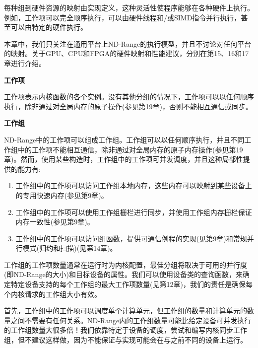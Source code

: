 每种组到硬件资源的映射由实现定义，这种灵活性使程序能够在各种硬件上执行。例如，工作项可以完全顺序执行，可以由硬件线程和/或SIMD指令并行执行，甚至可以由特定的硬件执行。\par

本章中，我们只关注在通用平台上ND-Range的执行模型，并且不讨论对任何平台的映射。关于GPU、CPU和FPGA的硬件映射和性能建议，分别在第15、16和17章进行介绍。\par

\hspace*{\fill} \par %
\textbf{工作项}

工作项表示内核函数的各个实例。没有其他分组的情况下，工作项可以以任何顺序执行，除非通过对全局内存的原子操作(参见第19章)，否则不能相互通信或同步。\par

\hspace*{\fill} \par %
\textbf{工作组}

ND-Range中的工作项可以组成工作组。工作组可以以任何顺序执行，并且不同工作组中的工作项不能相互通信，除非通过对全局内存的原子内存操作(参见第19章)。然而，使用某些构造时，工作组中的工作项可并发调度，并且这种局部性提供的能力有:\par

\begin{enumerate}
	\item 工作组中的工作项可以访问工作组本地内存，这些内存可以映射到某些设备上的专用快速内存(参见第9章)。
	\item 工作组中的工作项可以使用工作组栅栏进行同步，并使用工作组内存栅栏保证内存一致性(参见第9章)。
	\item 工作组中的工作项可以访问组函数，提供可通信例程的实现(见第9章)和常规并行模式(归约和扫描)(见第14章)。
\end{enumerate}

工作组的工作项数量通常在运行时为内核配置，最佳分组将取决于可用的并行度(即ND-Range的大小)和目标设备的属性。我们可以使用设备类的查询函数，来确定特定设备支持的每个工作组的最大工作项数量(见第12章)，我们的责任是确保每个内核请求的工作组大小有效。\par

首先，工作组中的工作项可以调度单个计算单元，但工作组的数量和计算单元的数量之间不需要有任何关系。ND-Range内的工作组数量可能比给定设备可并发执行的工作组数量大很多倍！我们依靠特定于设备的调度，尝试和编写内核同步工作组，但不建议这样做，因为不能保证与实现可能会在与之前不同的设备上运行。\par

